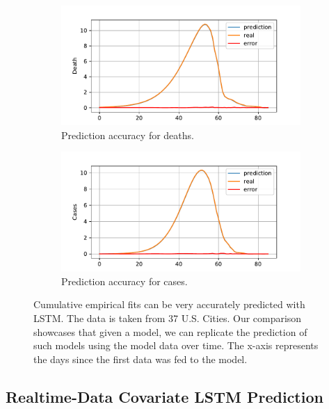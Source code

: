 \documentclass[a4paper, inpress]{jds} %
\renewcommand{\_}{%
    \textunderscore\hspace{0pt}%
}
\begin{document}
\begin{figure}[!h]
    \centering

    \begin{subfigure}{.49\textwidth}
      \centering
      \includegraphics[width=1.0\linewidth]{images/Fig4a.pdf}  
      \caption{Prediction accuracy for deaths.}
      \label{fig:magic-a}
    \end{subfigure}
    \begin{subfigure}{0.49\textwidth}
      \centering
      \includegraphics[width=1.0\linewidth]{images/Fig4b.pdf}        
      \caption{Prediction accuracy for cases.}
      \label{fig:magic-b}
    \end{subfigure}

    \caption{Cumulative empirical fits can be very accurately
      predicted with LSTM. The data is taken from 37 U.S. Cities. Our
      comparison showcases that given a model, we can replicate the
      prediction of such models using the model data over time. The
      x-axis represents the days since the first data was fed to the
      model.}
    \label{fig:magic-1}
\end{figure}




\subsection{Realtime-Data Covariate LSTM Prediction}
\label{sec:lstm-covariate}
\end{document}
